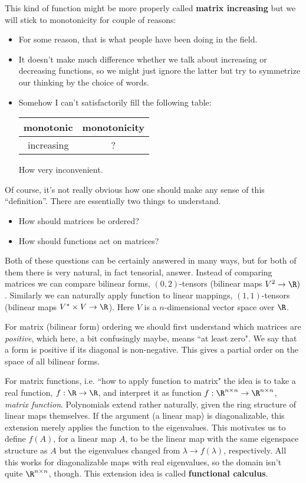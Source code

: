 This kind of function might be more properly called \textbf{matrix increasing} but we will stick to monotonicity for couple of reasons:
\begin{itemize}
	\item For some reason, that is what people have been doing in the field.
	\item It doesn't make much difference whether we talk about increasing or decreasing functions, so we might just ignore the latter but try to symmetrize our thinking by the choice of words.
	\item Somehow I can't satisfactorily fill the following table:
	\begin{center}
	\begin{tabular}{| c | c |}
		\hline
		monotonic & monotonicity \\
		\hline
		increasing & ? \\
		\hline
	\end{tabular}
	\end{center}
	How very inconvenient.
\end{itemize}

Of course, it's not really obvious how one should make any sense of this ``definition''. There are essentially two things to understand.
\begin{itemize}
	\item How should matrices be ordered?
	\item How should functions act on matrices?
\end{itemize}
Both of these questions can be certainly answered in many ways, but for both of them there is very natural, in fact tensorial, answer. Instead of comparing matrices we can compare bilinear forms, $(0, 2)$-tensors (bilinear maps $V^2 \to \R)$. Similarly we can naturally apply function to linear mappings, $(1, 1)$-tensors (bilinear maps $V^{*} \times V \to \R$). Here $V$ is a $n$-dimensional vector space over $\R$.

For matrix (bilinear form) ordering we should first understand which matrices are \textit{positive}, which here, a bit confusingly maybe, means ``at least zero". We say that a form is positive if its diagonal is non-negative. This gives a partial order on the space of all bilinear forms.

For matrix functions, i.e. ``how to apply function to matrix" the idea is to take a real function, $f : \R \to \R$, and interpret it as function $f : \R^{n \times n} \to \R^{n \times n}$, \textit{matrix function}. Polynomials extend rather naturally, given the ring structure of linear maps themselves. If the argument (a linear map) is diagonalizable, this extension merely applies the function to the eigenvalues. This motivates us to define $f(A)$, for a linear map $A$, to be the linear map with the same eigenspace structure as $A$ but the eigenvalues changed from $\lambda \to f(\lambda)$, respectively. All this works for diagonalizable maps with real eigenvalues, so the domain isn't quite $\R^{n \times n}$, though. This extension idea is called \textbf{functional calculus}.

